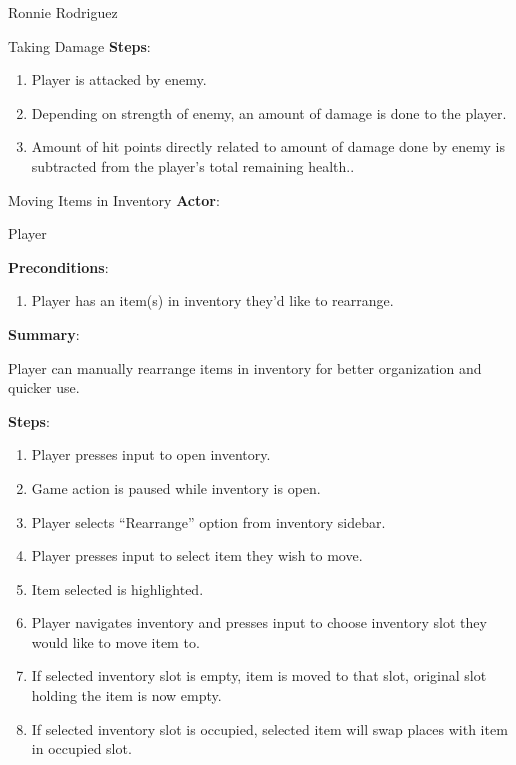 \documentclass[12pt]{report}
\begin{document}
\begin{section}{Ronnie Rodriguez}
\begin{subsection}{Taking Damage}
\textbf{Steps}:

\begin{enumerate}
\item Player is attacked by enemy.
\item Depending on strength of enemy, an amount of damage is done to the
player.
\item Amount of hit points directly related to amount of damage done by
enemy is subtracted from the player's total remaining health..
\end{enumerate}
\end{subsection}

\begin{subsection}{Moving Items in Inventory}
\textbf{Actor}:

Player

\textbf{Preconditions}:

\begin{enumerate}
\item Player has an item(s) in inventory they'd like to rearrange.
\end{enumerate}

\textbf{Summary}:

Player can manually rearrange items in inventory for better
organization and quicker use.

\textbf{Steps}:

\begin{enumerate}
\item Player presses input to open inventory.
\item Game action is paused while inventory is open.
\item Player selects ``Rearrange'' option from inventory sidebar.
\item Player presses input to select item they wish to move.
\item Item selected is highlighted.
\item Player navigates inventory and presses input to choose inventory slot
they would like to move item to.
\item If selected inventory slot is empty, item is moved to that slot,
original slot holding the item is now empty.
\item If selected inventory slot is occupied, selected item will swap places
with item in occupied slot. 
\end{enumerate}
\end{subsection}
\end{section}
\end{document}
